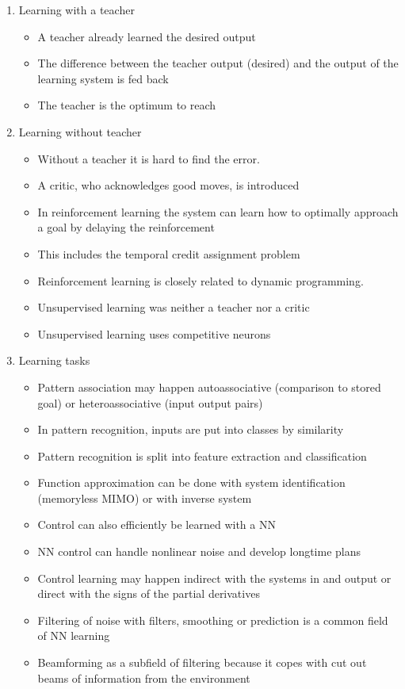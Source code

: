 \documentclass{scrartcl}
\begin{document}
\begin{enumerate}
\item Learning with a teacher
	\begin{itemize}
	\item A teacher already learned the desired output
	\item The difference between the teacher output (desired) and the output of the learning system is fed back
	\item The teacher is the optimum to reach
 	\end{itemize}
 	
\item Learning without teacher
	\begin{itemize}
	\item Without a teacher it is hard to find the error.
	\item A critic, who acknowledges good moves, is introduced
	\item In reinforcement learning the system can learn how to optimally approach a goal by delaying the reinforcement
	\item This includes the temporal credit assignment problem
	\item Reinforcement learning is closely related to dynamic programming.
	\item Unsupervised learning was neither a teacher nor a critic
	\item Unsupervised learning uses competitive neurons
	\end{itemize}
	
\item Learning tasks
	\begin{itemize}
	\item Pattern association may happen autoassociative (comparison to stored goal) or heteroassociative (input output pairs)
	\item In pattern recognition, inputs are put into classes by similarity
	\item Pattern recognition is split into feature extraction and classification
	\item Function approximation can be done with system identification  (memoryless MIMO) or with inverse system 
	\item Control can also efficiently be learned with a NN
	\item NN control can handle nonlinear noise and develop longtime plans
	\item Control learning may happen indirect with the systems in and output or direct with the signs of the partial derivatives
	\item Filtering of noise with filters, smoothing or prediction is a common field of NN learning
	\item Beamforming as a subfield of filtering because it copes with cut out beams of information from the environment
	\end{itemize}


\end{enumerate}
\end{document}
